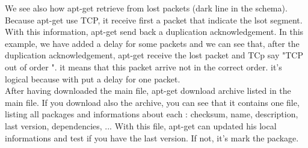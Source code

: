 \documentclass[twoside]{article}
\begin{document}
\begin{multicols}{2}
We see also how apt-get retrieve from lost packets (dark line in the schema).  Because apt-get use TCP, it receive first a packet that indicate the lsot segment.  With this information, apt-get send back a duplication acknowledgement.  In this example, we have added a delay for some packets and we can see that, after the duplication acknowledgement, apt-get receive the lost packet and TCp say "TCP out of order ".  it means that this packet arrive not in the correct order.  it's logical because with put a delay for one packet.\\
After having downloaded the main file, apt-get download archive listed in the main file.  If you download also the archive, you can see that it contains one file, listing all packages and informations about each : checksum, name, description, last version, dependencies, ...  With this file, apt-get can updated his local informations and test if you have the last version.  If not, it's mark the package.\\






\printbibliography


\end{multicols}
\end{document}

